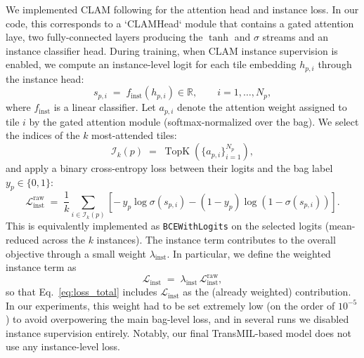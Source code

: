 We implemented CLAM following \cite{Lu} for the attention head and instance loss. In our code, this corresponds to a `CLAMHead` module that contains a gated attention laye, two fully-connected layers producing the $\tanh$ and $\sigma$ streams and an instance classifier head. %
During training, when CLAM instance supervision is enabled, we compute an instance-level logit for each tile embedding $h_{p,i}$ through the instance head:
\begin{equation}
s_{p,i} \;=\; f_{\text{inst}}(h_{p,i}) \in \mathbb{R}, \qquad i=1,\dots,N_p,
\end{equation}
where $f_{\text{inst}}$ is a linear classifier.
Let $a_{p,i}$ denote the attention weight assigned to tile $i$ by the gated attention module (softmax-normalized over the bag). We select the indices of the $k$ most-attended tiles:
\begin{equation}
\mathcal{I}_k(p) \;=\; \operatorname{TopK}\!\left(\{a_{p,i}\}_{i=1}^{N_p}\right),
\end{equation}
and apply a binary cross-entropy loss between their logits and the bag label $y_p \in \{0,1\}$:
\begin{equation}\label{eq:inst_loss}
\mathcal{L}_{\text{inst}}^{\text{raw}}
\;=\;
\frac{1}{k}\sum_{i \in \mathcal{I}_k(p)}
\left[
-\, y_p \log \sigma(s_{p,i})
- (1-y_p)\log\!\left(1-\sigma(s_{p,i})\right)
\right].
\end{equation}
This is equivalently implemented as \texttt{BCEWithLogits} on the selected logits (mean-reduced across the $k$ instances). The instance term contributes to the overall objective through a small weight $\lambda_{\text{inst}}$. In particular, we define the weighted instance term as
\begin{equation}\label{eq:inst_weighted}
\mathcal{L}_{\text{inst}} \;=\; \lambda_{\text{inst}}\,\mathcal{L}_{\text{inst}}^{\text{raw}},
\end{equation}
so that Eq.~\ref{eq:loss_total} includes $\mathcal{L}_{\text{inst}}$ as the (already weighted) contribution. In our experiments, this weight had to be set extremely low (on the order of $10^{-5}$) to avoid overpowering the main bag-level loss, and in several runs we disabled instance supervision entirely. Notably, our final TransMIL-based model does not use any instance-level loss.



